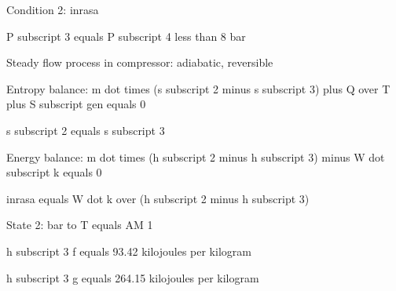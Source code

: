 Condition 2: inrasa

P subscript 3 equals P subscript 4 less than 8 bar

Steady flow process in compressor: adiabatic, reversible

Entropy balance: m dot times (s subscript 2 minus s subscript 3) plus Q over T plus S subscript gen equals 0

s subscript 2 equals s subscript 3

Energy balance: m dot times (h subscript 2 minus h subscript 3) minus W dot subscript k equals 0

inrasa equals W dot k over (h subscript 2 minus h subscript 3)

State 2: bar to T equals AM 1

h subscript 3 f equals 93.42 kilojoules per kilogram

h subscript 3 g equals 264.15 kilojoules per kilogram